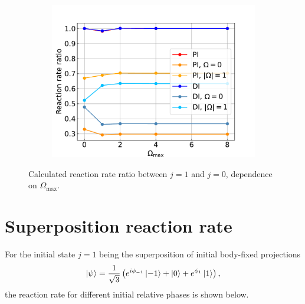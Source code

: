 \documentclass{article}
\begin{document}
    \begin{figure}[H]
        \centering
        \begin{subfigure}{.7\linewidth}
            \centering
            \includegraphics[width=\linewidth]{coriolis_rr_omega_maxes_ratio.pdf}
        \end{subfigure} 
        \caption{Calculated reaction rate ratio between $j = 1$ and $j = 0$, dependence on $\Omega_\text{max}$.}
    \end{figure}

\section{Superposition reaction rate}
    For the initial state $j = 1$ being the superposition of initial body-fixed projections
    \begin{equation}
        \ket{\psi} = \frac{1}{\sqrt{3}} \left(e^{i\phi_{-1}}\ket{-1} + \ket{0} + e^{\phi_1}\ket{1}\right),
    \end{equation}
    the reaction rate for different initial relative phases is shown below.
\end{document}
